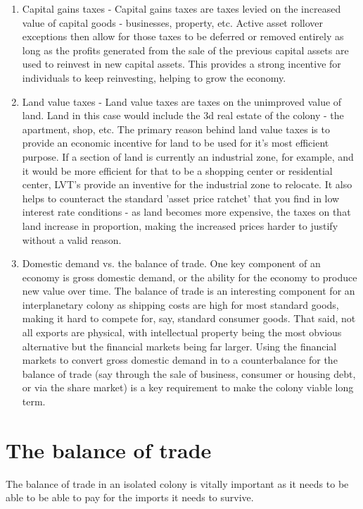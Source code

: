\documentclass[10pt]{article}
\begin{document}
\begin{enumerate}
\item Capital gains taxes - Capital gains taxes are taxes levied on the increased value of capital goods - businesses, property, etc. Active asset rollover exceptions then allow for those taxes to be deferred or removed entirely as long as the profits generated from the sale of the previous capital assets are used to reinvest in new capital assets. This provides a strong incentive for individuals to keep reinvesting, helping to grow the economy.

\item Land value taxes - Land value taxes are taxes on the unimproved value of land. Land in this case would include the 3d real estate of the colony - the apartment, shop, etc. The primary reason behind land value taxes is to provide an economic incentive for land to be used for it's most efficient purpose. If a section of land is currently an industrial zone, for example, and it would be more efficient for that to be a shopping center or residential center, LVT's provide an inventive for the industrial zone to relocate. It also helps to counteract the standard 'asset price ratchet' that you find in low interest rate conditions - as land becomes more expensive, the taxes on that land increase in proportion, making the increased prices harder to justify without a valid reason.

\item Domestic demand vs. the balance of trade. One key component of an economy is gross domestic demand, or the ability for the economy to produce new value over time. The balance of trade is an interesting component for an interplanetary colony as shipping costs are high for most standard goods, making it hard to compete for, say, standard consumer goods. That said, not all exports are physical, with intellectual property being the most obvious alternative but the financial markets being far larger. Using the financial markets to convert gross domestic demand in to a counterbalance for the balance of trade (say through the sale of business, consumer or housing debt, or via the share market) is a key requirement to make the colony viable long term.

\end{enumerate}

\section{The balance of trade}
The balance of trade in an isolated colony is vitally important as it needs to be able to be able to pay for the imports it needs to survive.
\end{document}
